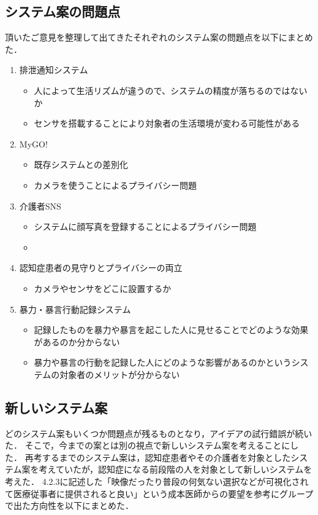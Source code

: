 \documentclass[../report]{subfiles}
\begin{document}
\subsection{システム案の問題点}
頂いたご意見を整理して出てきたそれぞれのシステム案の問題点を以下にまとめた．

\begin{enumerate}
    \item[] 排泄通知システム
\begin{itemize}
    \item 人によって生活リズムが違うので、システムの精度が落ちるのではないか
    \item センサを搭載することにより対象者の生活環境が変わる可能性がある
\end{itemize}

    \item[] MyGO!
\begin{itemize}
    \item 既存システムとの差別化
    \item カメラを使うことによるプライバシー問題
\end{itemize}

    \item[] 介護者SNS
\begin{itemize}
    \item システムに顔写真を登録することによるプライバシー問題
    \item 
\end{itemize}

    \item[] 認知症患者の見守りとプライバシーの両立
\begin{itemize}
    \item カメラやセンサをどこに設置するか
\end{itemize}

    \item[] 暴力・暴言行動記録システム
\begin{itemize}
    \item 記録したものを暴力や暴言を起こした人に見せることでどのような効果があるのか分からない
    \item 暴力や暴言の行動を記録した人にどのような影響があるのかというシステムの対象者のメリットが分からない
\end{itemize}
\end{enumerate}

\subsection{新しいシステム案}
どのシステム案もいくつか問題点が残るものとなり，アイデアの試行錯誤が続いた．
そこで，今までの案とは別の視点で新しいシステム案を考えることにした．
再考するまでのシステム案は，認知症患者やその介護者を対象としたシステム案を考えていたが，認知症になる前段階の人を対象として新しいシステムを考えた．
4.2.3に記述した「映像だったり普段の何気ない選択などが可視化されて医療従事者に提供されると良い」という成本医師からの要望を参考にグループで出た方向性を以下にまとめた．
\end{document}
